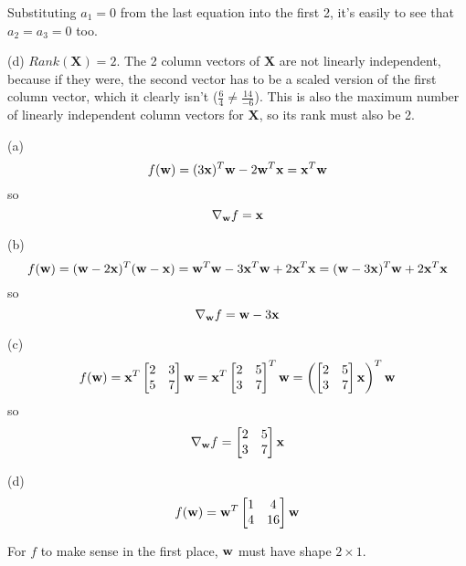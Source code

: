 \documentclass[a4paper, 12pt]{article}
\begin{document}
\begin{solution}
    Substituting $a_1 = 0$ from the last equation into the first 2, it's easily to see that $a_2 = a_3 = 0$ too.

    (d) $Rank(\mathbf{X}) = 2$. The 2 column vectors of $\mathbf{X}$ are not linearly independent, because if they were, the second vector has to be a scaled version of the first column vector, which it clearly isn't ($\frac{6}{4} \neq \frac{14}{-6}$). This is also the maximum number of linearly independent column vectors for $\mathbf{X}$, so its rank must also be 2.
\end{solution}

\begin{problem} [Problem 3]
\end{problem}
\begin{solution}
(a)\[
f(\mathbf{w}) = (3\mathbf{x})^T\mathbf{w} - 2\mathbf{w}^T \mathbf{x} = \mathbf{x}^T \mathbf{w}
\]
so \[
\nabla_{\mathbf{w}} f = \mathbf{x}
\]

(b) \[
f(\mathbf{w}) = (\mathbf{w} - 2\mathbf{x})^T (\mathbf{w} - \mathbf{x}) = \mathbf{w}^T \mathbf{w} - 3\mathbf{x}^T \mathbf{w} + 2\mathbf{x}^T \mathbf{x} = (\mathbf{w} - 3 \mathbf{x})^T \mathbf{w} + 2\mathbf{x}^T \mathbf{x}
\]
so \[
\nabla_{\mathbf{w}} f = \mathbf{w} - 3 \mathbf{x}
\]

(c) \[
f(\mathbf{w}) = \mathbf{x}^T \begin{bmatrix}
    2 & 3 \\
    5 & 7
\end{bmatrix} \mathbf{w} = \mathbf{x}^T \begin{bmatrix}
    2 & 5 \\
    3 & 7
\end{bmatrix}^T \mathbf{w} = \left(\begin{bmatrix}
    2 & 5 \\
    3 & 7
\end{bmatrix} \mathbf{x} \right)^T \mathbf{w}
\]
so \[
\nabla_{\mathbf{w}} f = \begin{bmatrix}
    2 & 5 \\
    3 & 7
\end{bmatrix} \mathbf{x}
\]

(d)
\[
f(\mathbf{w}) = \mathbf{w}^T \begin{bmatrix}
    1 & 4 \\
    4 & 16
\end{bmatrix} \mathbf{w}
\]

For $f$ to make sense in the first place, $\mathbf{w}$ must have shape $2 \times 1$.


\end{solution}
\end{document}
